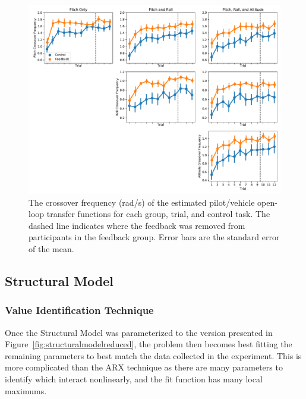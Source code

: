 \begin{figure}[tb]
    \begin{center}
        \includegraphics[width=\linewidth]{figures/Modeling/crossover_measures.pdf}
        \caption[The crossover frequency of the estimated pilot/vehicle open-loop transfer functions for each group, trial, and control task]{The crossover frequency (rad/s) of the estimated pilot/vehicle open-loop transfer functions for each group, trial, and control task.
            The dashed line indicates where the feedback was removed from participants in the feedback group.
            Error bars are the standard error of the mean.}
        \label{figure:arxcomplete}
    \end{center}
\end{figure}

\subsection{Structural Model}
\subsubsection{Value Identification Technique}
Once the Structural Model was parameterized to the version presented in Figure~\ref{fig:structuralmodelreduced}, the problem then becomes best fitting the remaining parameters to best match the data collected in the experiment.
This is more complicated than the ARX technique as there are many parameters to identify which interact nonlinearly, and the fit function has many local maximums.

